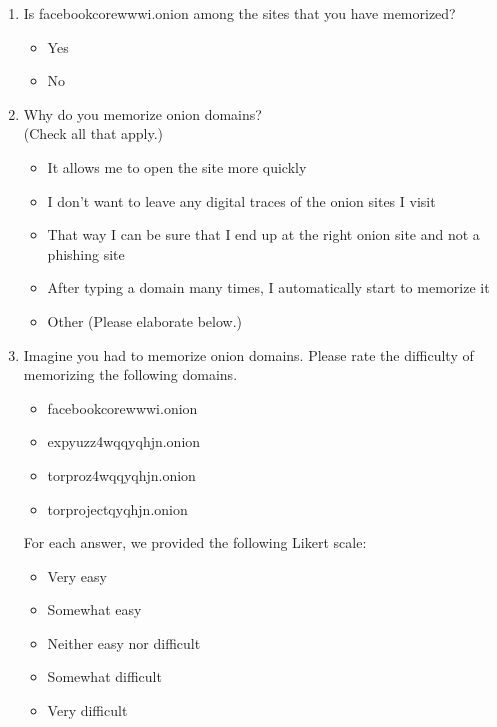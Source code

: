 \begin{enumerate}
    \item Is facebookcorewwwi.onion among the sites that you have memorized?
        \begin{itemize}[label=$\Circle$]
            \item Yes
            \item No
        \end{itemize}

    \item Why do you memorize onion domains?\\(Check all that apply.)
        \begin{itemize}[label=$\Square$]
            \item It allows me to open the site more quickly
            \item I don't want to leave any digital traces of the onion sites I
                visit
            \item That way I can be sure that I end up at the right onion site
                and not a phishing site
            \item After typing a domain many times, I automatically start to
                memorize it
            \item Other (Please elaborate below.)
        \end{itemize}

    \item Imagine you had to memorize onion domains. Please rate the difficulty
        of memorizing the following domains.
        \begin{itemize}
            \item facebookcorewwwi.onion
            \item expyuzz4wqqyqhjn.onion
            \item torproz4wqqyqhjn.onion
            \item torprojectqyqhjn.onion
        \end{itemize}
        For each answer, we provided the following Likert scale:
        \begin{itemize}
            \item Very easy
            \item Somewhat easy
            \item Neither easy nor difficult
            \item Somewhat difficult
            \item Very difficult
        \end{itemize}


\end{enumerate}
